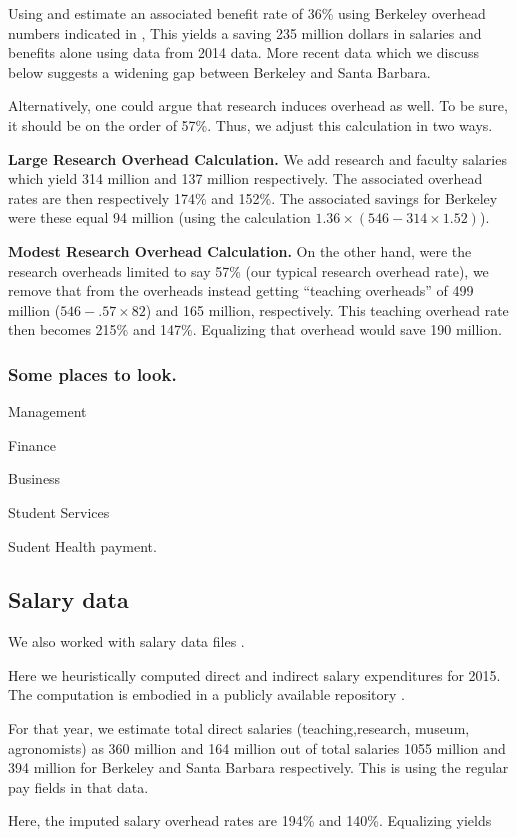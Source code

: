 \documentclass{article}
\begin{document}
Using and estimate an associated benefit rate of 36\% using Berkeley
overhead numbers indicated in \cite{rev-trends}, This yields a saving
235 million dollars in salaries and benefits alone using data from
2014 data.  More recent data which we discuss below suggests a
widening gap between Berkeley and Santa Barbara.

Alternatively, one could argue that research induces overhead
as well.  To be sure, it should be on the order of 57\%. Thus,
we adjust this calculation in two ways. 

{\bf Large Research Overhead Calculation.} We add research and faculty
salaries which yield 314 million and 137 million respectively. The
associated overhead rates are then respectively 174\% and 152\%.  The
associated savings for Berkeley were these equal 94 million (using the
calculation $1.36\times (546 - 314\times1.52)$).

{\bf Modest Research Overhead Calculation.} On the other hand, were
the research overheads limited to say 57\% (our typical research
overhead rate), we remove that from the overheads instead getting
``teaching overheads'' of 499 million ($546 - .57\times 82$) and 165
million, respectively.  This teaching overhead rate then becomes 215\%
and 147\%.  Equalizing that overhead would save 190 million.

\subsubsection{Some places to look.}

Management

Finance

Business

Student Services

Sudent Health payment. 

\subsection{Salary data}

We also worked with salary data files \cite{salary,ucpay}.

Here we heuristically computed direct and indirect salary expenditures
for 2015. The computation is embodied in a publicly available
repository \cite{github-link}. 

For that year, we estimate total direct salaries (teaching,research,
museum, agronomists) as 360 million and 164 million out
of total salaries 1055 million and 394 million for Berkeley
and Santa Barbara respectively.  This is using the regular
pay fields in that data. 

Here, the imputed salary overhead rates are 194\% and 140\%. 
Equalizing yields 




\end{document}
